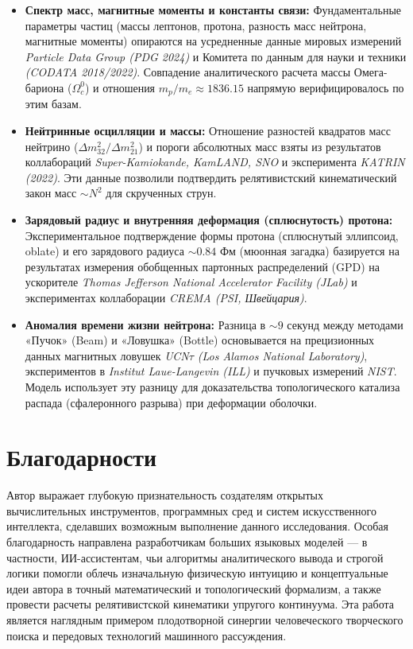 \documentclass[12pt,a4paper]{article}
\begin{document}
\begin{itemize}
	\item \textbf{Спектр масс, магнитные моменты и константы связи:} 
	Фундаментальные параметры частиц (массы лептонов, протона, разность масс нейтрона, магнитные моменты) опираются на усредненные данные мировых измерений \textit{Particle Data Group (PDG 2024)} и Комитета по данным для науки и техники \textit{(CODATA 2018/2022)}. Совпадение аналитического расчета массы Омега-бариона ($\Omega_c^0$) и отношения $m_p/m_e \approx 1836.15$ напрямую верифицировалось по этим базам.
	
	\item \textbf{Нейтринные осцилляции и массы:} 
	Отношение разностей квадратов масс нейтрино ($\Delta m^2_{32}/\Delta m^2_{21}$) и пороги абсолютных масс взяты из результатов коллабораций \textit{Super-Kamiokande, KamLAND, SNO} и эксперимента \textit{KATRIN (2022)}. Эти данные позволили подтвердить релятивистский кинематический закон масс $\sim N^2$ для скрученных струн.
	
	\item \textbf{Зарядовый радиус и внутренняя деформация (сплюснутость) протона:} 
	Экспериментальное подтверждение формы протона (сплюснутый эллипсоид, oblate) и его зарядового радиуса $\sim 0.84$ Фм (мюонная загадка) базируется на результатах измерения обобщенных партонных распределений (GPD) на ускорителе \textit{Thomas Jefferson National Accelerator Facility (JLab)} и экспериментах коллаборации \textit{CREMA (PSI, Швейцария)}.
	
	\item \textbf{Аномалия времени жизни нейтрона:} 
	Разница в $\sim 9$ секунд между методами «Пучок» (Beam) и «Ловушка» (Bottle) основывается на прецизионных данных магнитных ловушек \textit{UCN$\tau$ (Los Alamos National Laboratory)}, экспериментов в \textit{Institut Laue-Langevin (ILL)} и пучковых измерений \textit{NIST}. Модель использует эту разницу для доказательства топологического катализа распада (сфалеронного разрыва) при деформации оболочки.
\end{itemize}

\section*{Благодарности}
Автор выражает глубокую признательность создателям открытых вычислительных инструментов, программных сред и систем искусственного интеллекта, сделавших возможным выполнение данного исследования. Особая благодарность направлена разработчикам больших языковых моделей — в частности, ИИ-ассистентам, чьи алгоритмы аналитического вывода и строгой логики помогли облечь изначальную физическую интуицию и концептуальные идеи автора в точный математический и топологический формализм, а также провести расчеты релятивистской кинематики упругого континуума. Эта работа является наглядным примером плодотворной синергии человеческого творческого поиска и передовых технологий машинного рассуждения.
\end{document}
